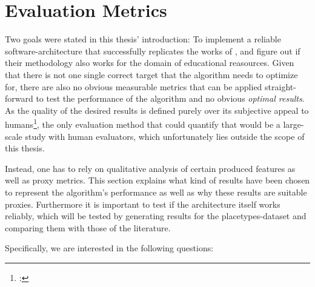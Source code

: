 



\section{Evaluation Metrics}
\label{sec:eval_metrics}

Two goals were stated in this thesis' introduction: To implement a reliable software-architecture that successfully replicates the works of \textcite{Derrac2015}, and figure out if their methodology also works for the domain of educational reasources. Given that there is not one single correct target that the algorithm needs to optimize for, there are also no obvious measurable metrics that can be applied straight-forward to test the performance of the algorithm and no obvious \textit{optimal results}. As the quality of the desired results is defined purely over its subjective appeal to humans\footnote{\cite[133]{Alshaikh2019}: }, the only evaluation method that could quantify that would be a large-scale study with human evaluators, which unfortunately lies outside the scope of this thesis.

Instead, one has to rely on qualitative analysis of certain produced features as well as proxy metrics. This section explains what kind of results have been chosen to represent the algorithm's performance as well as why these results are suitable proxies. Furthermore it is important to test if the architecture itself works reliably, which will be tested by generating results for the placetypes-dataset and comparing them with those of the literature.

Specifically, we are interested in the following questions:

